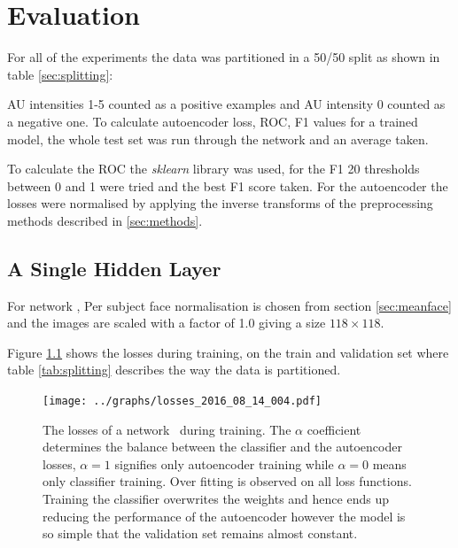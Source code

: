 \chapter{Evaluation} \label{chap:Evaluation}

  For all of the experiments the data was partitioned in a 50/50 split as shown in table \ref{sec:splitting}:
  \begin{table}[h!]
  \end{table}

  AU intensities 1-5 counted as a positive examples and AU intensity 0 counted as a negative one.
  To calculate autoencoder loss, ROC, F1 values for a trained model, the whole test
  set was run through the network and an average taken.

  To calculate the ROC the \textit{sklearn} library was used, for the F1 20 thresholds
  between 0 and 1 were tried and the best F1 score taken. For the autoencoder
  the losses were normalised by applying the inverse transforms of the preprocessing
  methods described in \ref{sec:methods}.

  \section{A Single Hidden Layer}

    For network \networkI,
    Per subject face normalisation
    is chosen from section \ref{sec:meanface} and the images are scaled with a factor of 1.0 giving a size $118 \times 118$.


    Figure \ref{fig:simple} shows the losses during training, on the train and validation set where table \ref{tab:splitting}
    describes the way the data is partitioned.

    \begin{figure}[!h]
    \centering
    \texttt{[image: ../graphs/losses\_2016\_08\_14\_004.pdf]}
    \caption{The losses of a network \networkI\ during training. The $\alpha$ coefficient determines the balance between the
    classifier and the autoencoder losses, $\alpha=1$ signifies only autoencoder training
    while $\alpha=0$ means only classifier training. Over fitting is observed
    on all loss functions. Training the classifier
    overwrites the weights and hence ends up reducing
    the performance of the autoencoder however the
    model is so simple that the validation set remains almost constant.}
    \label{fig:simple}
    \end{figure}

